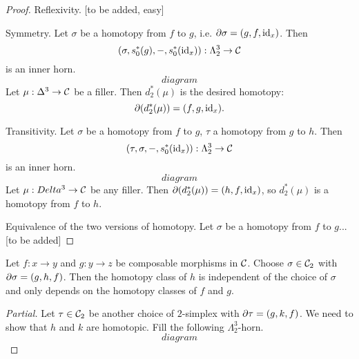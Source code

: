 \begin{proof}
Reflexivity. [to be added, easy]

Symmetry. Let $\sigma$ be a homotopy from $f$ to $g$, i.e. $\partial\sigma=(g,f,\operatorname{id}_x)$. Then
\[(\sigma,s_0^*(g),-,s_0^*(\operatorname{id}_x)):\Lambda^3_2\to\mathcal{C}\]
is an inner horn.
\[diagram\]
Let $\mu:\Delta^3\to\mathcal{C}$ be a filler. Then $d_2^*(\mu)$ is the desired homotopy:
\[\partial(d_2^*(\mu))=(f,g,\operatorname{id}_x).\]

Transitivity. Let $\sigma$ be a homotopy from $f$ to $g$, $\tau$ a homotopy from $g$ to $h$. Then
\[(\tau,\sigma,-,s_0^*(\operatorname{id}_x)):\Lambda^3_2\to\mathcal{C}\]
is an inner horn.
\[diagram\]
Let $\mu:Delta^3\to\mathcal{C}$ be any filler. Then $\partial(d_2^*(\mu))=(h,f,\operatorname{id}_x)$, so $d_2^*(\mu)$ is a homotopy from $f$ to $h$.

Equivalence of the two versions of homotopy. Let $\sigma$ be a homotopy from $f$ to $g$... [to be added]
\end{proof}

\begin{proposition}
Let $f:x\to y$ and $g:y\to z$ be composable morphisms in $\mathcal{C}$. Choose $\sigma\in\mathcal{C}_2$ with $\partial\sigma=(g,h,f)$. Then the homotopy class of $h$ is independent of the choice of $\sigma$ and only depends on the homotopy classes of $f$ and $g$.
\end{proposition}

\begin{proof}[Partial]
Let $\tau\in\mathcal{C}_2$ be another choice of $2$-simplex with $\partial\tau=(g,k,f)$. We need to show that $h$ and $k$ are homotopic. Fill the following $\Lambda^3_2$-horn.
\[diagram\]
\end{proof}
